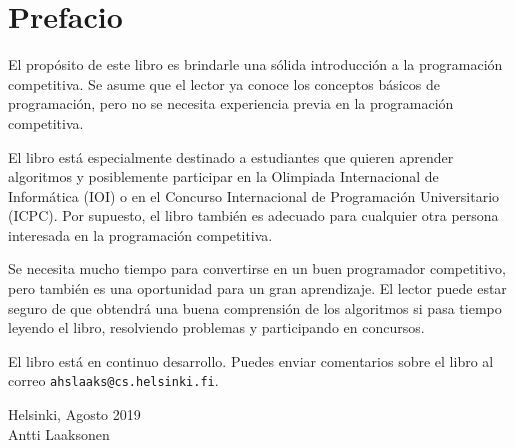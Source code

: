 \chapter*{Prefacio}

El propósito de este libro es brindarle
una sólida introducción a la programación competitiva.
Se asume que el lector ya
conoce los conceptos básicos de programación, pero no
se necesita experiencia previa en la programación competitiva.

El libro está especialmente destinado a
estudiantes que quieren aprender algoritmos y
posiblemente participar en
la Olimpiada Internacional de Informática (IOI) o
en el Concurso Internacional de Programación Universitario (ICPC).
Por supuesto, el libro también es adecuado para
cualquier otra persona interesada en la programación competitiva.

Se necesita mucho tiempo para convertirse en un buen programador competitivo,
pero también es una oportunidad para un gran aprendizaje.
El lector puede estar seguro de que obtendrá
una buena comprensión de los algoritmos
si pasa tiempo leyendo el libro,
resolviendo problemas y participando en concursos.

El libro está en continuo desarrollo.
Puedes enviar comentarios sobre el libro al correo
\texttt{ahslaaks@cs.helsinki.fi}.

\begin{flushright}
Helsinki, Agosto 2019 \\
Antti Laaksonen
\end{flushright}
